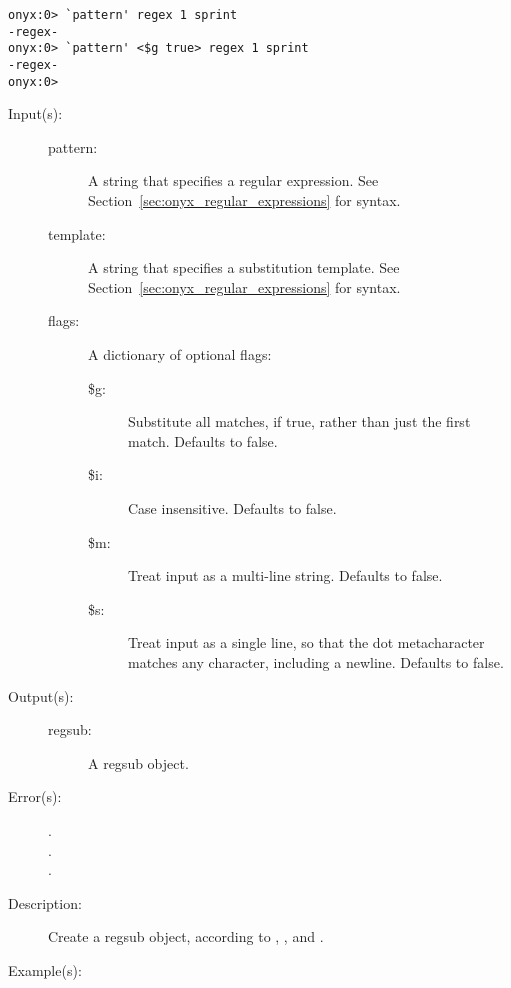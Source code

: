 \begin{description}
\begin{description}
\begin{verbatim}
onyx:0> `pattern' regex 1 sprint
-regex-
onyx:0> `pattern' <$g true> regex 1 sprint
-regex-
onyx:0>
		\end{verbatim}
	\end{description}
\label{systemdict:regsub}
\item[{\onyxop{pattern template flags}{regsub}{regsub}}: ]
\item[{\onyxop{pattern template}{regsub}{regsub}}: ]
	\begin{description}\item[]
	\item[Input(s): ]
		\begin{description}\item[]
		\item[pattern: ]
			A string that specifies a regular expression.  See
			Section~\ref{sec:onyx_regular_expressions} for syntax.
		\item[template: ]
			A string that specifies a substitution template.  See
			Section~\ref{sec:onyx_regular_expressions} for syntax.
		\item[flags: ]
			A dictionary of optional flags:
			\begin{description}%
			\item[\$g: ]
				Substitute all matches, if true, rather than
				just the first match.  Defaults to false.
			\item[\$i: ] Case insensitive.  Defaults to false.
			\item[\$m: ] Treat input as a multi-line string.
				Defaults to false.
			\item[\$s: ] Treat input as a single line, so that
				the dot metacharacter matches any character,
				including a newline.  Defaults to false.
			\end{description}
		\end{description}
	\item[Output(s): ]
		\begin{description}\item[]
		\item[regsub: ]
			A regsub object.
		\end{description}
	\item[Error(s): ]
		\begin{description}\item[]
		\item[.]
		\item[.]
		\item[.]
		\end{description}
	\item[Description: ]
		Create a regsub object, according to ,
		, and .
	\item[Example(s): ]\begin{verbatim}


\end{verbatim}
\end{description}
\end{description}
